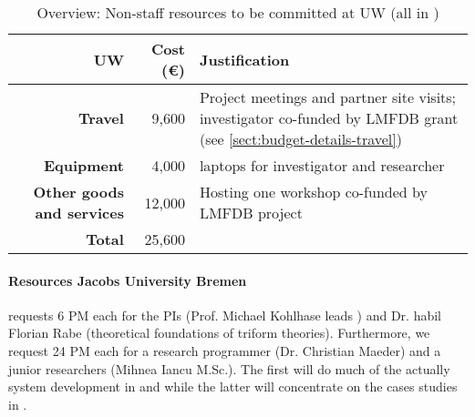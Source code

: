 \bigskip
\begin{table}[H]
\begin{tabular}{|r|r|p{8.5cm}|}
\hline
\textbf{UW} & \textbf{Cost (\euro)} & \textbf{Justification} \\\hline
\textbf{Travel} & 9,600 & Project meetings and partner site visits;
investigator co-funded by LMFDB grant (see \ref{sect:budget-details-travel})\\\hline
\textbf{Equipment} & 4,000 & laptops for investigator and researcher\\\hline    %

\textbf{Other goods and services} & 12,000 & Hosting one workshop
co-funded by LMFDB project\\\hline   %
\textbf{Total} & 25,600\\\cline{1-2}
\end{tabular}
\caption{Overview: Non-staff resources to be committed at UW (all in \texteuro)}\vspace*{-1em}
\end{table}

\paragraph{Resources Jacobs University Bremen}

 requests 6 PM each for the PIs (Prof. Michael Kohlhase leads )
and Dr. habil Florian Rabe (theoretical foundations of triform theories). Furthermore, we
request 24 PM each for a research programmer (Dr. Christian Maeder) and a junior
researchers (Mihnea Iancu M.Sc.). The first will do much of the actually system development
in  and  while the latter will concentrate on the cases studies
in .

